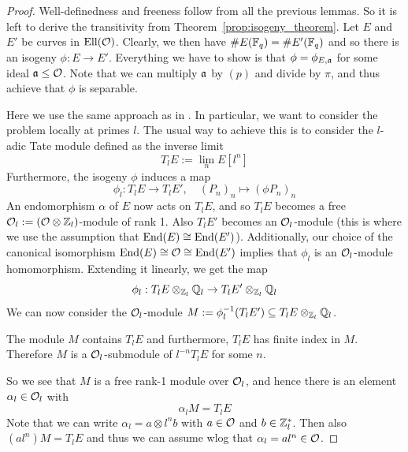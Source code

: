 \begin{proof}
    Well-definedness and freeness follow from all the previous lemmas.
    So it is left to derive the transitivity from Theorem~\ref{prop:isogeny_theorem}.
    Let $E$ and $E'$ be curves in $\mathrm{Ell}(\mathcal{O})$.
    Clearly, we then have $\#E(\mathbb{F}_q) = \#E'(\mathbb{F}_q)$ and so there is an isogeny $\phi: E \to E'$.
    Everything we have to show is that $\phi = \phi_{E, \mathfrak{a}}$ for some ideal $\mathfrak{a} \leq \mathcal{O}$.
    Note that we can multiply $\mathfrak{a}$ by $(p)$ and divide by $\pi$, and thus achieve that $\phi$ is separable.

    Here we use the same approach as in \cite[Thm~4.5]{class_group_action_waterhouse}.
    In particular, we want to consider the problem locally at primes $l$.
    The usual way to achieve this is to consider the $l$-adic Tate module defined as the inverse limit
    \begin{equation*}
        T_lE := \lim_n E[l^n]
    \end{equation*}
    Furthermore, the isogeny $\phi$ induces a map
    \begin{equation*}
        \phi_l: T_lE \to T_lE', \quad (P_n)_n \mapsto (\phi P_n)_n
    \end{equation*}
    An endomorphism $\alpha$ of $E$ now acts on $T_lE$, and so $T_lE$ becomes a free $\mathcal{O}_l := (\mathcal{O} \otimes \mathbb{Z}_l)$-module of rank 1.
    Also $T_lE'$ becomes an $\mathcal{O}_l$-module (this is where we use the assumption that $\mathrm{End}(E) \cong \mathrm{End}(E')$).
    Additionally, our choice of the canonical isomorphism $\mathrm{End}(E) \cong \mathcal{O} \cong \mathrm{End}(E')$ implies that $\phi_l$ is an $\mathcal{O}_l$-module homomorphism.
    Extending it linearly, we get the map
    \begin{equation*}
        \phi_l: T_lE \otimes_{\mathbb{Z}_l} \mathbb{Q}_l \to T_lE' \otimes_{\mathbb{Z}_l} \mathbb{Q}_l
    \end{equation*}
    We can now consider the $\mathcal{O}_l$-module $M := \phi_l^{-1}(T_lE') \subseteq T_lE \otimes_{\mathbb{Z}_l} \mathbb{Q}_l$.

    The module $M$ contains $T_lE$ and furthermore, $T_lE$ has finite index in $M$.
    Therefore $M$ is a $\mathcal{O}_l$-submodule of $l^{-n}T_lE$ for some $n$.

    So we see that $M$ is a free rank-1 module over $\mathcal{O}_l$, and hence there is an element $\alpha_l \in \mathcal{O}_l$ with
    \begin{equation*}
        \alpha_l M = T_lE
    \end{equation*}
    Note that we can write $\alpha_l = a \otimes l^n b$ with $a \in \mathcal{O}$ and $b \in \mathbb{Z}_l^*$.
    Then also $(al^n) M = T_lE$ and thus we can assume wlog that $\alpha_l = al^n \in \mathcal{O}$.


\end{proof}

